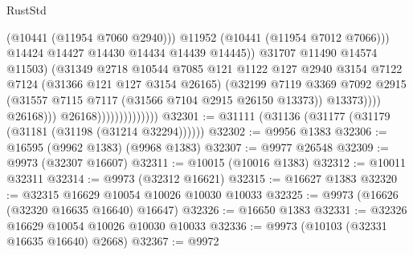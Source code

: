 \begin{lexlean}{RustStd}
\begin{coremodule}
                                                    (@10441 (@11954 @7060 @2940)))
                                                  @11952
                                                  (@10441 (@11954 @7012 @7066)))
                                                @14424
                                                @14427
                                                @14430
                                                @14434
                                                @14439
                                                @14445))
                                            @31707
                                            @11490
                                            @14574
                                            @11503)
                                          (@31349
                                            @2718
                                            @10544
                                            @7085
                                            @121
                                            @1122
                                            @127
                                            @2940
                                            @3154
                                            @7122
                                            @7124
                                            (@31366 @121 @127 @3154 @26165)
                                            (@32199
                                              @7119
                                              @3369
                                              @7092
                                              @2915
                                              (@31557
                                                @7115
                                                @7117
                                                (@31566 @7104 @2915 @26150 @13373))
                                              @13373))))
                                      @26168)))
                                @26168))))))))))))))
@32301 := @31111 (@31136 (@31177 (@31179 (@31181 (@31198 (@31214 @32294))))))
@32302 := @9956 @1383
@32306 := @16595 (@9962 @1383) (@9968 @1383)
@32307 := @9977 @26548
@32309 := @9973 (@32307 @16607)
@32311 := @10015 (@10016 @1383)
@32312 := @10011 @32311
@32314 := @9973 (@32312 @16621)
@32315 := @16627 @1383
@32320 := @32315 @16629 @10054 @10026 @10030 @10033
@32325 := @9973 (@16626 (@32320 @16635 @16640) @16647)
@32326 := @16650 @1383
@32331 := @32326 @16629 @10054 @10026 @10030 @10033
@32336 := @9973 (@10103 (@32331 @16635 @16640) @2668)
@32367 := @9972

\end{coremodule}
\end{lexlean}
